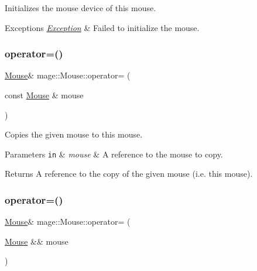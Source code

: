 Initializes the mouse device of this mouse.


\begin{DoxyExceptions}{Exceptions}
{\em \hyperlink{classmage_1_1_exception}{Exception}} & Failed to initialize the mouse. \\
\hline
\end{DoxyExceptions}
\hypertarget{classmage_1_1_mouse_a585119f1b0db3fbc7436c86676518c8c}{}\label{classmage_1_1_mouse_a585119f1b0db3fbc7436c86676518c8c} 
\subsubsection{\texorpdfstring{operator=()}{operator=()}\hspace{0.1cm}{\footnotesize\ttfamily [1/2]}}
{\footnotesize\ttfamily \hyperlink{classmage_1_1_mouse}{Mouse}\& mage\+::\+Mouse\+::operator= (\begin{DoxyParamCaption}\item[{const \hyperlink{classmage_1_1_mouse}{Mouse} \&}]{mouse }\end{DoxyParamCaption})\hspace{0.3cm}{\ttfamily [delete]}}

Copies the given mouse to this mouse.


\begin{DoxyParams}[1]{Parameters}
\mbox{\tt in}  & {\em mouse} & A reference to the mouse to copy. \\
\hline
\end{DoxyParams}
\begin{DoxyReturn}{Returns}
A reference to the copy of the given mouse (i.\+e. this mouse). 
\end{DoxyReturn}
\hypertarget{classmage_1_1_mouse_a42d80f535a12356762a506438036dd71}{}\label{classmage_1_1_mouse_a42d80f535a12356762a506438036dd71} 
\subsubsection{\texorpdfstring{operator=()}{operator=()}\hspace{0.1cm}{\footnotesize\ttfamily [2/2]}}
{\footnotesize\ttfamily \hyperlink{classmage_1_1_mouse}{Mouse}\& mage\+::\+Mouse\+::operator= (\begin{DoxyParamCaption}\item[{\hyperlink{classmage_1_1_mouse}{Mouse} \&\&}]{mouse }\end{DoxyParamCaption})\hspace{0.3cm}{\ttfamily [delete]}}

